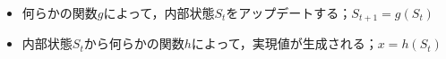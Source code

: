 \begin{itemize}
	\item 何らかの関数$g$によって，内部状態$S_t$をアップデートする；$S_{t+1}=g(S_t)$
	\item 内部状態$S_t$から何らかの関数$h$によって，実現値が生成される；$x = h(S_t)$
\end{itemize}
